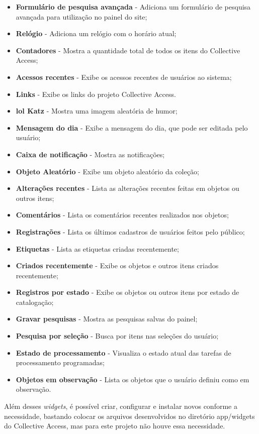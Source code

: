 \documentclass[a4paper,12pt,oneside,onecolumn,final,fleqn]{repUERJ}
\begin{document}
\begin{itemize}
	\item \textbf{Formulário de pesquisa avançada} - Adiciona um formulário de pesquisa avançada para utilização no painel do site;
	\item \textbf{Relógio} - Adiciona um relógio com o horário atual;
	\item \textbf{Contadores} - Mostra a quantidade total de todos os itens do Collective Access;
	\item \textbf{Acessos recentes} - Exibe os acessos recentes de usuários ao sistema;
	\item \textbf{Links} - Exibe os links do projeto Collective Access.
	\item \textbf{lol Katz} - Mostra uma imagem aleatória de humor;
	\item \textbf{Mensagem do dia} - Exibe a mensagem do dia, que pode ser editada pelo usuário;
	\item \textbf{Caixa de notificação} - Mostra as notificações;
	\item \textbf{Objeto Aleatório} - Exibe um objeto aleatório da coleção;
	\item \textbf{Alterações recentes} - Lista as alterações recentes feitas em objetos ou outros itens;
	\item \textbf{Comentários} - Lista os comentários recentes realizados nos objetos;
	\item \textbf{Registrações} - Lista os últimos cadastros de usuários feitos pelo público;
	\item \textbf{Etiquetas} - Lista as etiquetas criadas recentemente;
	\item \textbf{Criados recentemente} - Exibe os objetos e outros itens criados recentemente;
	\item \textbf{Registros por estado} - Exibe os objetos ou outros itens por estado de catalogação;
	\item \textbf{Gravar pesquisas} - Mostra as pesquisas salvas do painel;
	\item \textbf{Pesquisa por seleção} - Busca por itens nas seleções do usuário;
	\item \textbf{Estado de processamento} - Visualiza o estado atual das tarefas de processamento programadas;
	\item \textbf{Objetos em observação} - Lista os objetos que o usuário definiu como em observação.
\end{itemize}

Além desses \textit{widgets}, é possível criar, configurar e instalar novos conforme a necessidade, bastando colocar os arquivos desenvolvidos no diretório app/widgets do Collective Access, mas para este projeto não houve essa necessidade.
\end{document}
